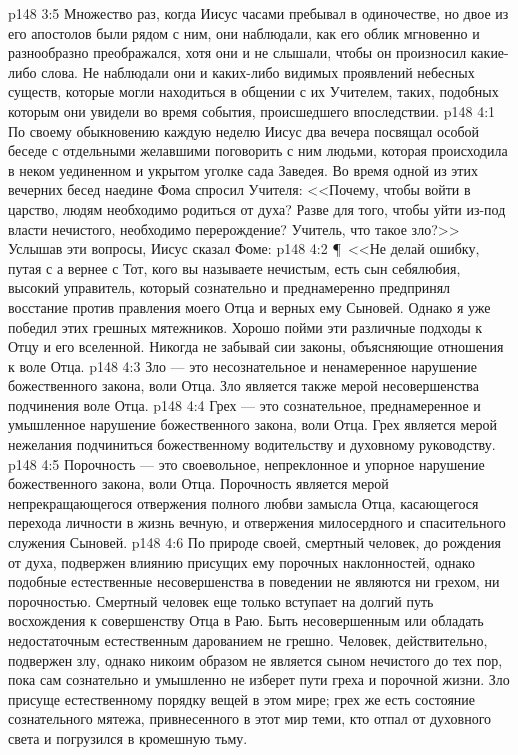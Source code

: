 \vs p148 3:5 Множество раз, когда Иисус часами пребывал в одиночестве, но двое из его апостолов были рядом с ним, они наблюдали, как его облик мгновенно и разнообразно преображался, хотя они и не слышали, чтобы он произносил какие\hyp{}либо слова. Не наблюдали они и каких\hyp{}либо видимых проявлений небесных существ, которые могли находиться в общении с их Учителем, таких, подобных которым они увидели во время события, происшедшего впоследствии.
\vs p148 4:1 По своему обыкновению каждую неделю Иисус два вечера посвящал особой беседе с отдельными желавшими поговорить с ним людьми, которая происходила в неком уединенном и укрытом уголке сада Заведея. Во время одной из этих вечерних бесед наедине Фома спросил Учителя: <<Почему, чтобы войти в царство, людям необходимо родиться от духа? Разве для того, чтобы уйти из\hyp{}под власти нечистого, необходимо перерождение? Учитель, что такое зло?>> Услышав эти вопросы, Иисус сказал Фоме:
\vs p148 4:2 \P\ <<Не делай ошибку, путая  с  а вернее с  Тот, кого вы называете нечистым, есть сын себялюбия, высокий управитель, который сознательно и преднамеренно предпринял восстание против правления моего Отца и верных ему Сыновей. Однако я уже победил этих грешных мятежников. Хорошо пойми эти различные подходы к Отцу и его вселенной. Никогда не забывай сии законы, объясняющие отношения к воле Отца.
\vs p148 4:3 Зло --- это несознательное и ненамеренное нарушение божественного закона, воли Отца. Зло является также мерой несовершенства подчинения воле Отца.
\vs p148 4:4 Грех --- это сознательное, преднамеренное и умышленное нарушение божественного закона, воли Отца. Грех является мерой нежелания подчиниться божественному водительству и духовному руководству.
\vs p148 4:5 Порочность --- это своевольное, непреклонное и упорное нарушение божественного закона, воли Отца. Порочность является мерой непрекращающегося отвержения полного любви замысла Отца, касающегося перехода личности в жизнь вечную, и отвержения милосердного и спасительного служения Сыновей.
\vs p148 4:6 По природе своей, смертный человек, до рождения от духа, подвержен влиянию присущих ему порочных наклонностей, однако подобные естественные несовершенства в поведении не являются ни грехом, ни порочностью. Смертный человек еще только вступает на долгий путь восхождения к совершенству Отца в Раю. Быть несовершенным или обладать недостаточным естественным дарованием не грешно. Человек, действительно, подвержен злу, однако никоим образом не является сыном нечистого до тех пор, пока сам сознательно и умышленно не изберет пути греха и порочной жизни. Зло присуще естественному порядку вещей в этом мире; грех же есть состояние сознательного мятежа, привнесенного в этот мир теми, кто отпал от духовного света и погрузился в кромешную тьму.
